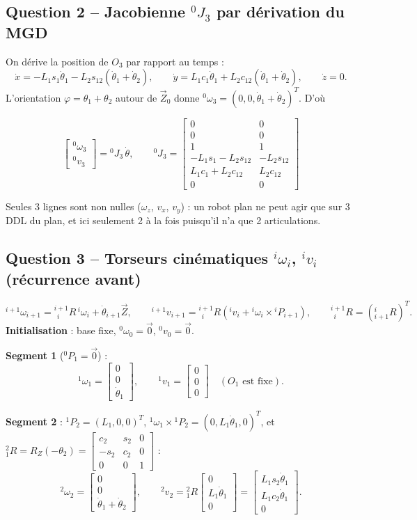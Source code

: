 \documentclass[11pt,a4paper]{article}
\newcommand{\dt}[1]{\dot\theta_{#1}}
\newcommand{\col}[3]{\begin{bmatrix}#1\\#2\\#3\end{bmatrix}}
\begin{document}
\subsection*{Question 2 -- Jacobienne ${}^0J_3$ par dérivation du MGD}
On dérive la position de $O_3$ par rapport au temps :
\[\dot x=-L_1s_1\dt1-L_2s_{12}(\dt1+\dt2),\qquad \dot y=L_1c_1\dt1+L_2c_{12}(\dt1+\dt2),\qquad \dot z=0.\]
L'orientation $\varphi=\theta_1+\theta_2$ autour de $\vec Z_0$ donne ${}^0\omega_3=(0,0,\dt1+\dt2)^T$. D'où
\begin{res}
\[\begin{bmatrix}{}^0\omega_3\\{}^0v_3\end{bmatrix}={}^0J_3\,\dot\theta,\qquad
{}^0J_3=\begin{bmatrix}0&0\\0&0\\1&1\\-L_1s_1-L_2s_{12}&-L_2s_{12}\\L_1c_1+L_2c_{12}&L_2c_{12}\\0&0\end{bmatrix}\]
\end{res}
\begin{rem}Seules 3 lignes sont non nulles ($\omega_z$, $v_x$, $v_y$) : un robot plan ne peut agir que sur 3 DDL du plan, et ici seulement 2 à la fois puisqu'il n'a que 2 articulations.\end{rem}

\subsection*{Question 3 -- Torseurs cinématiques ${}^i\omega_i$, ${}^iv_i$ (récurrence avant)}
\[{}^{i+1}\omega_{i+1}={}^{i+1}_{\ \ i}R\,{}^i\omega_i+\dot\theta_{i+1}\vec Z,\qquad
{}^{i+1}v_{i+1}={}^{i+1}_{\ \ i}R\left({}^iv_i+{}^i\omega_i\times{}^iP_{i+1}\right),\qquad {}^{i+1}_{\ \ i}R=({}^i_{i+1}R)^T.\]
\textbf{Initialisation} : base fixe, ${}^0\omega_0=\vec 0$, ${}^0v_0=\vec0$.

\textbf{Segment 1} (${}^0P_1=\vec 0$) :
\[{}^1\omega_1=\col00{\dt1},\qquad {}^1v_1=\col000\quad(O_1\text{ est fixe}).\]

\textbf{Segment 2} : ${}^1P_2=(L_1,0,0)^T$, ${}^1\omega_1\times{}^1P_2=(0,L_1\dt1,0)^T$, et ${}^2_1R=R_Z(-\theta_2)=\begin{bmatrix}c_2&s_2&0\\-s_2&c_2&0\\0&0&1\end{bmatrix}$ :
\[{}^2\omega_2=\col00{\dt1+\dt2},\qquad {}^2v_2={}^2_1R\col0{L_1\dt1}0=\col{L_1s_2\dt1}{L_1c_2\dt1}{0}.\]
\end{document}

